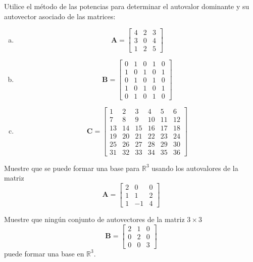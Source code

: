 \documentclass[11pt]{article}
\begin{document}
\begin{question} 
Utilice el método de las potencias para determinar el autovalor dominante y su autovector asociado de las matrices:
\begin{multicols}{3}
\begin{enumerate}[a)]
  \item 
\[ \bm{A} = \begin{bmatrix} 4 & 2 & 3 \\ 3 & 0 & 4 \\ 1 & 2 & 5 \end{bmatrix} \]
\item 
\[ \bm{B} = \begin{bmatrix} 0 & 1 & 0 & 1 & 0 \\ 1 & 0 & 1 & 0 & 1 \\ 0 & 1 & 0 & 1 & 0 \\ 1 & 0 & 1 & 0 & 1 \\ 0 & 1 & 0 & 1 & 0 \end{bmatrix} \]
\item 
    \[ \bm{C} = \begin{bmatrix}
        1 & 2 & 3 & 4 & 5 & 6 \\
        7 & 8 & 9 & 10 & 11 & 12 \\
        13 & 14 & 15 & 16 & 17 & 18 \\
        19 & 20 & 21 & 22 & 23 & 24 \\
        25 & 26 & 27 & 28 & 29 & 30 \\
        31 & 32 & 33 & 34 & 35 & 36
    \end{bmatrix} \]

\end{enumerate}
\end{multicols}
\end{question}

\begin{question} %
    Muestre que se puede formar una base para $\mathbb{R}^3$ usando los autovalores de la matriz
    \[ \bm{A} = \begin{bmatrix} 2 & 0 & 0 \\
        1 & 1 & 2 \\
    1 & -1 & 4 \end{bmatrix} \]
\end{question}

\begin{question} %
Muestre que ningún conjunto de autovectores de la matriz $3 \times 3$
\[ \bm{B} = \begin{bmatrix} 2 & 1 & 0 \\
           0 & 2 & 0 \\
       0 & 0 & 3 \end{bmatrix} \]
       puede formar una base en $\mathbb{R}^3$.
\end{question}
\end{document}
